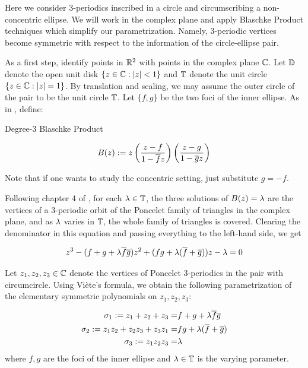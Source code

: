 Here we consider 3-periodics inscribed in a circle and circumscribing a non-concentric ellipse. We will work in the complex plane and apply Blaschke Product techniques \cite{daepp-2019} which simplify our parametrization. Namely, 3-periodic vertices become symmetric with respect to the information of the circle-ellipse pair.

As a first step, identify points in $\mathbb{R}^2$ with points in the complex plane $\mathbb{C}$. Let $\mathbb{D}$ denote the open unit disk $\{z\in\mathbb{C} : |z|<1\}$ and $\mathbb{T}$ denote the unit circle $\{z\in\mathbb{C} : |z|=1\}$. By translation and scaling, we may assume the outer circle of the pair to be the unit circle $\mathbb{T}$. Let $\{f,g\}$ be the two foci of the inner ellipse. As in \cite{daepp-2019}, define:

\begin{definition}{Degree-3 Blaschke Product} 

\[
B(z):=z\left( \frac{z-f}{1-\overline f z}\right) \left( \frac{z-g}{1-\overline g z}\right)
\]

\end{definition}

\noindent Note that if one wants to study the concentric setting, just substitute $g=-f$.

Following chapter 4 of \cite{daepp-2019}, for each $\lambda\in\mathbb{T}$, the three solutions of $B(z)=\lambda$ are the vertices of a 3-periodic orbit of the Poncelet family of triangles in the complex plane, and as $\lambda$ varies in $\mathbb{T}$, the whole family of triangles is covered. Clearing the denominator in this equation and passing everything to the left-hand side, we get

\[
z^3-(f+g+\lambda\overline{f} \overline{g})z^2+(f g+\lambda(\overline f+\overline g))z-\lambda=0
\]

Let $z_1,z_2,z_3\in\mathbb{C}$ denote the vertices of Poncelet 3-periodics in the pair with   circumcircle. Using Viète's formula, we obtain the following parametrization of the elementary symmetric polynomials on $z_1,z_2,z_3$:

\begin{definition}
\begin{align*}
    \sigma_1:=z_1+z_2+z_3=& f+g+\lambda\overline f \overline g \\
    \sigma_2:=z_1 z_2+z_2 z_3+z_3 z_1=& f g+\lambda(\overline f+\overline g) \\
    \sigma_3:=z_1 z_2 z_3=& \lambda
\end{align*}
where $f,g$ are the foci of the inner ellipse and $\lambda\in\mathbb{T}$ is the varying parameter.
\label{def:bla}
\end{definition}


